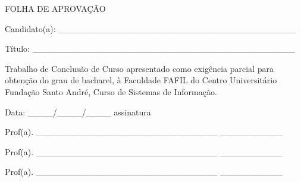 \thispagestyle{empty}

\vspace{3cm}
\begin{center}
FOLHA DE APROVAÇÃO \\
\end{center}

\vspace{3cm}

\hspace{-2cm} Candidato(a): \_\_\_\_\_\_\_\_\_\_\_\_\_\_\_\_\_\_\_\_\_\_\_\_\_\_\_\_\_\_\_\_\_\_\_\_\_\_

\vspace{0.5cm}

\hspace{-2cm} Título: \_\_\_\_\_\_\_\_\_\_\_\_\_\_\_\_\_\_\_\_\_\_\_\_\_\_\_\_\_\_\_\_\_\_\_\_\_\_\_\_\_\_

\vspace{3cm}

Trabalho de Conclusão de Curso apresentado como exigência parcial para obtenção
do grau de bacharel, à Faculdade FAFIL do Centro Universitário Fundação Santo André,
Curso de Sistemas de Informação.\\

\vspace{3cm}

\hspace{-2cm} Data: \_\_\_\_/\_\_\_\_/\_\_\_\_  \hspace{7cm} assinatura

\vspace{1cm}

\hspace{-2cm} Prof(a). \_\_\_\_\_\_\_\_\_\_\_\_\_\_\_\_\_\_\_\_\_\_\_\_\_\_\_\_\_  \hspace{1cm}\_\_\_\_\_\_\_\_\_\_
\vspace{0.5cm}

\hspace{-2cm} Prof(a). \_\_\_\_\_\_\_\_\_\_\_\_\_\_\_\_\_\_\_\_\_\_\_\_\_\_\_\_\_  \hspace{1cm}\_\_\_\_\_\_\_\_\_\_
\vspace{0.5cm}

\hspace{-2cm} Prof(a). \_\_\_\_\_\_\_\_\_\_\_\_\_\_\_\_\_\_\_\_\_\_\_\_\_\_\_\_\_  \hspace{1cm}\_\_\_\_\_\_\_\_\_\_

